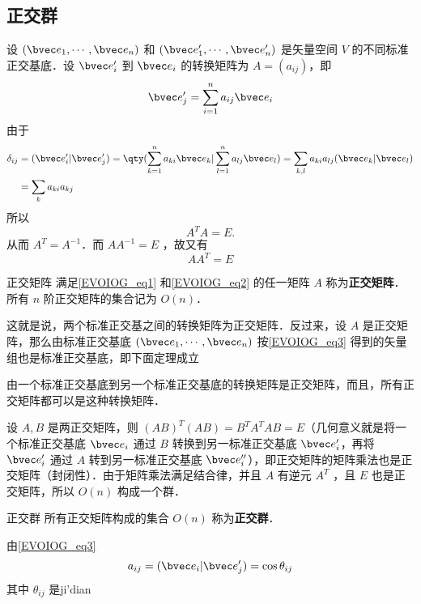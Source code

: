 \subsection{正交群}
设 $(\bvec e_1,\cdots,\bvec e_n)$ 和 $(\bvec e'_1,\cdots,\bvec e'_n)$ 是矢量空间 $V$ 的不同标准正交基底．设 $\bvec e'_i$ 到 $\bvec e_i$ 的转换矩阵为 $A=(a_{ij})$，即
\begin{equation}\label{EVOIOG_eq3}
\bvec e'_j=\sum_{i=1}^n a_{ij}\bvec e_i
\end{equation}
由于
\begin{equation}
\begin{aligned}
\delta_{ij}&=(\bvec e'_i|\bvec e'_j)=\qty(\sum_{k=1}^n a_{ki}\bvec e_k|\sum_{l=1}^n a_{lj}\bvec e_l)=\sum_{k,l}a_{ki}a_{lj}(\bvec e_k|\bvec e_l)\\
&=\sum_{k}a_{ki}a_{kj}
\end{aligned}
\end{equation}
所以 
\begin{equation}\label{EVOIOG_eq1}
A^T A=E.
\end{equation}
从而 $A^T=A^{-1}$．而 $AA^{-1}=E$ ，故又有
\begin{equation}\label{EVOIOG_eq2}
AA^T=E
\end{equation}
\begin{definition}{正交矩阵}
满足\autoref{EVOIOG_eq1} 和\autoref{EVOIOG_eq2} 的任一矩阵 $A$ 称为\textbf{正交矩阵}．所有 $n$ 阶正交矩阵的集合记为 $O(n)$．
\end{definition}
这就是说，两个标准正交基之间的转换矩阵为正交矩阵．反过来，设 $A$ 是正交矩阵，那么由标准正交基底 $(\bvec e_1,\cdots,\bvec e_n)$ 按\autoref{EVOIOG_eq3} 得到的矢量组也是标准正交基底，即下面定理成立
\begin{theorem}{}
由一个标准正交基底到另一个标准正交基底的转换矩阵是正交矩阵，而且，所有正交矩阵都可以是这种转换矩阵．
\end{theorem}

设 $A,B$ 是两正交矩阵，则 $(AB)^T(AB)=B^TA^TAB=E$（几何意义就是将一个标准正交基底 $\bvec e_i$ 通过 $B$ 转换到另一标准正交基底 $\bvec e'_i$，再将 $\bvec e'_i$ 通过 $A$ 转到另一标准正交基底 $\bvec e''_i$），即正交矩阵的矩阵乘法也是正交矩阵（封闭性）．由于矩阵乘法满足结合律，并且 $A$ 有逆元 $A^T$ ，且 $E$ 也是正交矩阵，所以 $O(n)$ 构成一个群．
\begin{definition}{正交群}
所有正交矩阵构成的集合 $O(n)$ 称为\textbf{正交群}．
\end{definition}

由\autoref{EVOIOG_eq3} 
\begin{equation}
a_{ij}=(\bvec e_i|\bvec e'_j)=\cos{\theta_{ij}}
\end{equation}
其中 $\theta_{ij}$ 是ji'dian